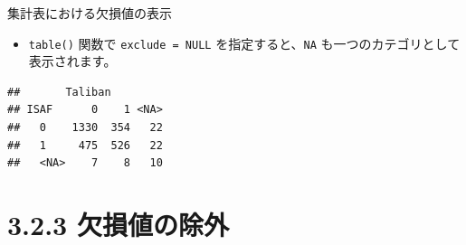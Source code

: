 \documentclass[
  ignorenonframetext,
]{beamer}
\newenvironment{Shaded}{\begin{snugshade}}{\end{snugshade}}
\newcommand{\AttributeTok}[1]{\textcolor[rgb]{0.77,0.63,0.00}{#1}}
\newcommand{\CommentTok}[1]{\textcolor[rgb]{0.56,0.35,0.01}{\textit{#1}}}
\newcommand{\ConstantTok}[1]{\textcolor[rgb]{0.00,0.00,0.00}{#1}}
\newcommand{\FunctionTok}[1]{\textcolor[rgb]{0.00,0.00,0.00}{#1}}
\newcommand{\NormalTok}[1]{#1}
\newcommand{\SpecialCharTok}[1]{\textcolor[rgb]{0.00,0.00,0.00}{#1}}
\providecommand{\tightlist}{%
  \setlength{\itemsep}{0pt}\setlength{\parskip}{0pt}}
\begin{document}
\begin{frame}[fragile]{集計表における欠損値の表示}
\protect\hypertarget{ux96c6ux8a08ux8868ux306bux304aux3051ux308bux6b20ux640dux5024ux306eux8868ux793a}{}
\begin{itemize}
\tightlist
\item
  \texttt{table()} 関数で \texttt{exclude\ =\ NULL}
  を指定すると、\texttt{NA} も一つのカテゴリとして表示されます。
\end{itemize}

\scriptsize

\begin{Shaded}
\end{Shaded}

\begin{verbatim}
##       Taliban
## ISAF      0    1 <NA>
##   0    1330  354   22
##   1     475  526   22
##   <NA>    7    8   10
\end{verbatim}

\normalsize
\end{frame}

\hypertarget{ux6b20ux640dux5024ux306eux9664ux5916}{%
\section{3.2.3
欠損値の除外}\label{ux6b20ux640dux5024ux306eux9664ux5916}}
\end{document}
